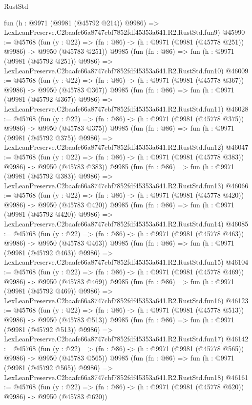 \begin{lexlean}{RustStd}
\begin{coremodule}
    fun (h : @9971 (@9981 (@45792 @214)) @9986) =>
    LexLeanPreserve.C2baafc66a8747cbf7852fdf45353a641.R2.RustStd.fun9)
@45990 := @45768
    (fun (y : @22) => (fn : @86) -> (h : @9971 (@9981 (@45778 @251)) @9986) -> @9950 (@45783 @251))
    @9985
    (fun (fn : @86) =>
    fun (h : @9971 (@9981 (@45792 @251)) @9986) =>
    LexLeanPreserve.C2baafc66a8747cbf7852fdf45353a641.R2.RustStd.fun10)
@46009 := @45768
    (fun (y : @22) => (fn : @86) -> (h : @9971 (@9981 (@45778 @367)) @9986) -> @9950 (@45783 @367))
    @9985
    (fun (fn : @86) =>
    fun (h : @9971 (@9981 (@45792 @367)) @9986) =>
    LexLeanPreserve.C2baafc66a8747cbf7852fdf45353a641.R2.RustStd.fun11)
@46028 := @45768
    (fun (y : @22) => (fn : @86) -> (h : @9971 (@9981 (@45778 @375)) @9986) -> @9950 (@45783 @375))
    @9985
    (fun (fn : @86) =>
    fun (h : @9971 (@9981 (@45792 @375)) @9986) =>
    LexLeanPreserve.C2baafc66a8747cbf7852fdf45353a641.R2.RustStd.fun12)
@46047 := @45768
    (fun (y : @22) => (fn : @86) -> (h : @9971 (@9981 (@45778 @383)) @9986) -> @9950 (@45783 @383))
    @9985
    (fun (fn : @86) =>
    fun (h : @9971 (@9981 (@45792 @383)) @9986) =>
    LexLeanPreserve.C2baafc66a8747cbf7852fdf45353a641.R2.RustStd.fun13)
@46066 := @45768
    (fun (y : @22) => (fn : @86) -> (h : @9971 (@9981 (@45778 @420)) @9986) -> @9950 (@45783 @420))
    @9985
    (fun (fn : @86) =>
    fun (h : @9971 (@9981 (@45792 @420)) @9986) =>
    LexLeanPreserve.C2baafc66a8747cbf7852fdf45353a641.R2.RustStd.fun14)
@46085 := @45768
    (fun (y : @22) => (fn : @86) -> (h : @9971 (@9981 (@45778 @463)) @9986) -> @9950 (@45783 @463))
    @9985
    (fun (fn : @86) =>
    fun (h : @9971 (@9981 (@45792 @463)) @9986) =>
    LexLeanPreserve.C2baafc66a8747cbf7852fdf45353a641.R2.RustStd.fun15)
@46104 := @45768
    (fun (y : @22) => (fn : @86) -> (h : @9971 (@9981 (@45778 @469)) @9986) -> @9950 (@45783 @469))
    @9985
    (fun (fn : @86) =>
    fun (h : @9971 (@9981 (@45792 @469)) @9986) =>
    LexLeanPreserve.C2baafc66a8747cbf7852fdf45353a641.R2.RustStd.fun16)
@46123 := @45768
    (fun (y : @22) => (fn : @86) -> (h : @9971 (@9981 (@45778 @513)) @9986) -> @9950 (@45783 @513))
    @9985
    (fun (fn : @86) =>
    fun (h : @9971 (@9981 (@45792 @513)) @9986) =>
    LexLeanPreserve.C2baafc66a8747cbf7852fdf45353a641.R2.RustStd.fun17)
@46142 := @45768
    (fun (y : @22) => (fn : @86) -> (h : @9971 (@9981 (@45778 @565)) @9986) -> @9950 (@45783 @565))
    @9985
    (fun (fn : @86) =>
    fun (h : @9971 (@9981 (@45792 @565)) @9986) =>
    LexLeanPreserve.C2baafc66a8747cbf7852fdf45353a641.R2.RustStd.fun18)
@46161 := @45768
    (fun (y : @22) => (fn : @86) -> (h : @9971 (@9981 (@45778 @620)) @9986) -> @9950 (@45783 @620))

\end{coremodule}
\end{lexlean}
